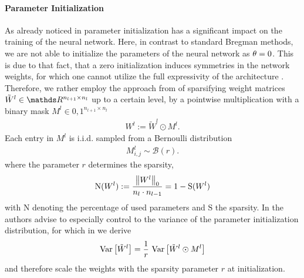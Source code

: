 \paragraph{Parameter Initialization} As already noticed in \cite{bengio10} parameter initialization has a significant impact on the training of the neural network. Here, in contrast to standard Bregman methods, we are not able to initialize the parameters of the neural network as $\theta=0$. This is due to that fact, that a zero initialization induces symmetries in the network weights, for which one cannot utilize the full expressivity of the architecture \cite[Ch. 6]{Goodfellow16}. Therefore, we rather employ the approach from \cite{liu2021,dettmers2019sparse,martens2010deep} of sparsifying weight matrices $\tilde W^l\in\R^{n_{l+1}\times n_l}$ up to a certain level, by a pointwise multiplication with a binary mask $M^l\in{0,1}^{n_{l+1}\times n_l}$
%
\begin{align*}
	W^l := \tilde W^{l} \odot M^l.
\end{align*}
%
%
Each entry in $M^l$ is i.i.d. sampled from a Bernoulli distribution
%
\begin{align*}
	M^l_{i,j}\sim \mathcal{B}(r).
\end{align*}
%
where the parameter $r$ determines the sparsity,
%
\begin{align*}
	\mathrm{N}(W^l):=\frac{\left\|W^l\right\|_0}{n_l \cdot n_{l-1}}=
	1 - \mathrm{S}(W^l)
\end{align*}
%
with $\mathrm{N}$ denoting the percentage of used parameters and $\mathrm{S}$ the sparsity.
%
%
In \cite{bengio10} the authors advise to especially control to the variance of the parameter initialization distribution, for which in \cite{bungert2022bregman} we derive
%
\begin{align}\label{eq:initcond2}
	\mathrm{Var}\left[\tilde W^l\right] = \frac{1}{r}~\mathrm{Var}\left[\tilde W^l \odot M^l\right]
\end{align}
%
and therefore scale the weights with the sparsity parameter $r$ at initialization.
%
%

